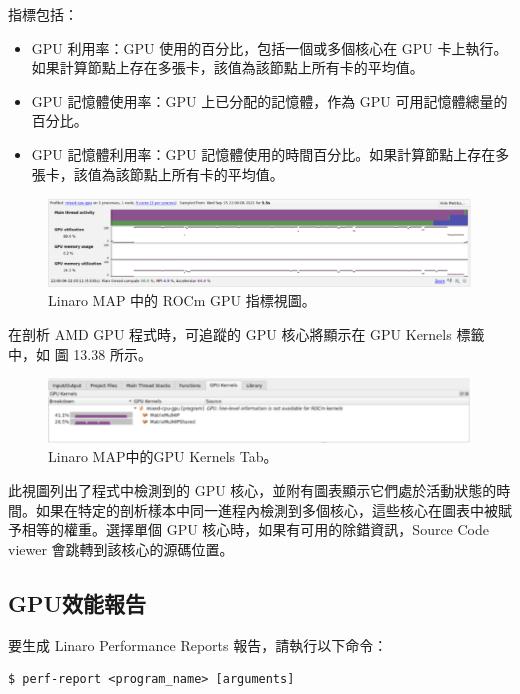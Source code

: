 指標包括：

\begin{itemize}
    \item GPU 利用率：GPU 使用的百分比，包括一個或多個核心在 GPU 卡上執行。如果計算節點上存在多張卡，該值為該節點上所有卡的平均值。
    \item GPU 記憶體使用率：GPU 上已分配的記憶體，作為 GPU 可用記憶體總量的百分比。
    \item GPU 記憶體利用率：GPU 記憶體使用的時間百分比。如果計算節點上存在多張卡，該值為該節點上所有卡的平均值。
\end{itemize}

\begin{figure}
    \centering
    \includegraphics[width=0.9\linewidth]{FileAusiliari/Screenshots/Figure13-37.png}
    \caption{Linaro MAP 中的 ROCm GPU 指標視圖。}
    \label{fig:PAPI37}
\end{figure}

在剖析 AMD GPU 程式時，可追蹤的 GPU 核心將顯示在 GPU Kernels 標籤中，如 圖 13.38 所示。

\begin{figure}
    \centering
    \includegraphics[width=0.9\linewidth]{FileAusiliari/Screenshots/Figure13-38.png}
    \caption{Linaro MAP中的GPU Kernels Tab。}
    \label{fig:PAPI38}
\end{figure}

此視圖列出了程式中檢測到的 GPU 核心，並附有圖表顯示它們處於活動狀態的時間。如果在特定的剖析樣本中同一進程內檢測到多個核心，這些核心在圖表中被賦予相等的權重。選擇單個 GPU 核心時，如果有可用的除錯資訊，Source Code viewer 會跳轉到該核心的源碼位置。

\subsection{GPU效能報告}

要生成 Linaro Performance Reports 報告，請執行以下命令：
\begin{lstlisting}
$ perf-report <program_name> [arguments]
\end{lstlisting}

